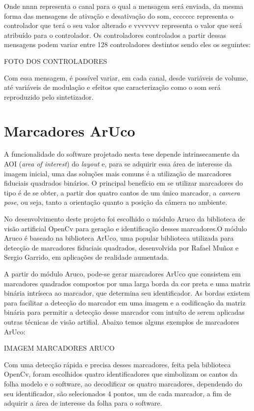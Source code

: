 \documentclass[12pt]{report}
\begin{document}
Onde nnnn representa o canal para o qual a mensagem será enviada, da mesma forma das mensagens de ativação e desativação do som, ccccccc representa o controlador que terá o seu valor alterado e vvvvvvv representa o valor que será atribuído para o controlador. Os controladores controlados a partir dessas mensagens podem variar entre 128 controladores destintos sendo eles os seguintes:

FOTO DOS CONTROLADORES

Com essa mensagem, é possível variar, em cada canal, desde variáveis de volume, até variáveis de modulação e efeitos que caracterização como o som será reproduzido pelo sintetizador.

\chapter{Marcadores ArUco}
\label{cha:fund-teor}

A funcionalidade do software projetado nesta tese depende intrinsecamente da AOI ({\it area of interest}) do {\it layout} e, para se adquirir essa área de interesse da imagem inicial, uma das soluções mais comuns é a utilização de marcadores fiduciais quadrados binários. O principal benefício em se utilizar marcadores do tipo é de se obter, a partir dos quatro cantos de um único marcador, a {\it camera pose}, ou seja, tanto a orientação quanto a posição da câmera no ambiente.

No desenvolvimento deste projeto foi escolhido o módulo Aruco da biblioteca de visão artificial OpenCv para geração e identificação desses marcadores.O módulo Aruco é baseado na biblioteca ArUco, uma popular biblioteca utilizada para detecção de marcadores fiduciais quadrados, desenvolvida por Rafael Muñoz e Sergio Garrido, em aplicações de realidade aumentada.

A partir do módulo Aruco, pode-se gerar marcadores ArUco que consistem em marcadores quadrados compostos por uma larga borda da cor preta e uma matriz binária intríseca ao marcador, que determina seu identificador. As bordas existem para facilitar a detecção do marcador em uma imagem e a codificação da matriz binária para permitir a detecção desse marcador com intuíto de serem aplicadas outras técnicas de visão artifial. Abaixo temos alguns exemplos de marcadores ArUco:

IMAGEM MARCADORES ARUCO

Com uma detecção rápida e precisa desses marcadores, feita pela biblioteca OpenCv, foram escolhidos quatro identificadores que simbolizam os cantos da folha modelo e o software, ao decodificar os quatro marcadores, dependendo do seu identificador, são selecionados 4 pontos, um de cada marcador, a fim de adquirir a área de interesse da folha para o software.
\end{document}
